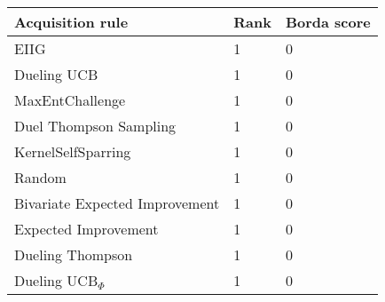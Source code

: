 \begin{tabular}{lll}
Acquisition rule & Rank & Borda score \\ 
\hline 
EIIG \citep{Benavoli2020}                          & 1 & 0 \\ 
Dueling UCB \citep{Benavoli2020}                   & 1 & 0 \\ 
MaxEntChallenge                                    & 1 & 0 \\ 
Duel Thompson Sampling \citep{Gonzalez2017}        & 1 & 0 \\ 
KernelSelfSparring \citep{Sui2017}                 & 1 & 0 \\ 
Random                                             & 1 & 0 \\ 
Bivariate Expected Improvement \citep{Nielsen2015} & 1 & 0 \\ 
Expected Improvement \citep{Brochu2010a}           & 1 & 0 \\ 
Dueling Thompson \citep{Benavoli2020}              & 1 & 0 \\ 
Dueling UCB$_\Phi$                                 & 1 & 0 \\ 
\hline 
\end{tabular}